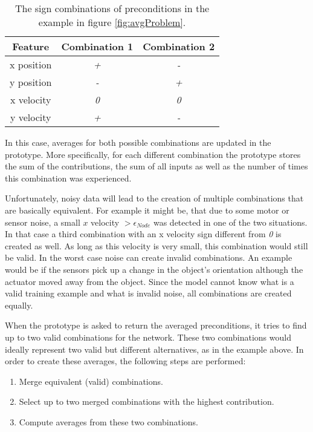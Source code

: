 \begin{table}
	\centering
	\begin{tabular}{|c|c|c|}
		\hline Feature & Combination 1 & Combination 2 \\ 
		\hline x position & \textit{+} & \textit{-} \\ 
		\hline y position & \textit{-} & \textit{+} \\ 
		\hline x velocity & \textit{0} & \textit{0} \\
		\hline y velocity & \textit{+} & \textit{-} \\ 
		\hline 
	\end{tabular} 
	\caption{The sign combinations of preconditions in the example in figure \ref{fig:avgProblem}.}
	\label{tab:signCombinations}
\end{table}

In this case, averages for both possible combinations are updated in the prototype. More specifically, for each different combination the prototype stores the sum of the contributions, the sum of all inputs as well as the number of times this combination was experienced. 

Unfortunately, noisy data will lead to the creation of multiple combinations that are basically equivalent. For example it might be, that due to some motor or sensor noise, a small $x$ velocity $>\epsilon_{Node}$ was detected in one of the two situations. In that case a third combination with an x velocity sign different from \textit{0} is created as well. As long as this velocity is very small, this combination would still be valid. In the worst case noise can create invalid combinations. An example would be if the sensors pick up a change in the object's orientation although the actuator moved away from the object. Since the model cannot know what is a valid training example and what is invalid noise, all combinations are created equally.

When the prototype is asked to return the averaged preconditions, it tries to find up to two valid combinations for the network. These two combinations would ideally represent two valid but different alternatives, as in the example above. 
In order to create these averages, the following steps are performed:
\begin{enumerate}
\item Merge equivalent (valid) combinations.
\item Select up to two merged combinations with the highest contribution.
\item Compute averages from these two combinations.
\end{enumerate}

